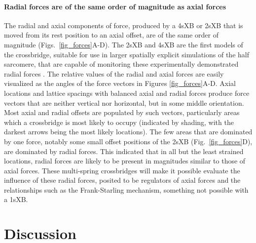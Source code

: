 \documentclass[]{article}
\begin{document}
\paragraph{Radial forces are of the same order of magnitude as axial forces} %
The radial and axial components of force, produced by a 4sXB or 2sXB that is moved from its rest position to an axial offset, are of the same order of magnitude (Figs.~\ref{fig_forces}A-D). 
The 2sXB and 4sXB are the first models of the crossbridge, suitable for use in larger spatially explicit simulations of the half sarcomere, that are capable of monitoring these experimentally demonstrated radial forces \citep{Cecchi1990, Millman1998}. 
The relative values of the radial and axial forces are easily visualized as the angles of the force vectors in Figures \ref{fig_forces}A-D. 
Axial locations and lattice spacings with balanced axial and radial forces produce force vectors that are neither vertical nor horizontal, but in some middle orientation.
Most axial and radial offsets are populated by such vectors, particularly areas which a crossbridge is most likely to occupy (indicated by shading, with the darkest arrows being the most likely locations). 
The few areas that are dominated by one force, notably some small offset positions of the 2sXB (Fig.~\ref{fig_forces}D), are dominated by radial forces.
This indicated that in all but the least strained locations, radial forces are likely to be present in magnitudes similar to those of axial forces. 
These multi-spring crossbridges will make it possible evaluate the influence of these radial forces, posited to be regulators of axial forces and the relationships such as the Frank-Starling mechanism, something not possible with a 1sXB. 



\section{Discussion} %

\end{document}

